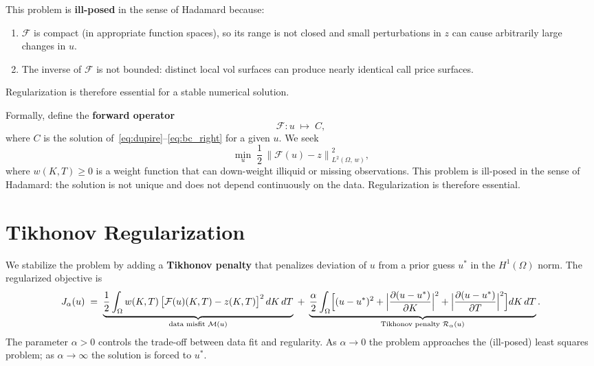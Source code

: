 \documentclass[11pt, a4paper]{article}
\newcommand{\pder}[2]{\frac{\partial #1}{\partial #2}}
\newcommand{\norm}[1]{\left\| #1 \right\|}
\newcommand{\Fop}{\mathcal{F}}          %
\newcommand{\Omg}{\Omega}
\theoremstyle{definition}
\theoremstyle{plain}
\begin{document}
This problem is \textbf{ill-posed} in the sense of Hadamard because:
\begin{enumerate}[label=(\roman*)]
  \item $\Fop$ is compact (in appropriate function spaces), so its range is
        not closed and small perturbations in $z$ can cause arbitrarily large
        changes in $u$.
  \item The inverse of $\Fop$ is not bounded: distinct local vol surfaces
        can produce nearly identical call price surfaces.
\end{enumerate}
Regularization is therefore essential for a stable numerical solution.

Formally, define the \textbf{forward operator}
\begin{equation}
  \Fop : u \;\longmapsto\; C,
\end{equation}
where $C$ is the solution of~\eqref{eq:dupire}--\eqref{eq:bc_right}
for a given $u$. We seek
\begin{equation}\label{eq:least_squares}
  \min_{u} \;\frac{1}{2}\,\norm{\Fop(u) - z}_{L^2(\Omg,\,w)}^2,
\end{equation}
where $w(K, T) \geq 0$ is a weight function that can down-weight illiquid
or missing observations. This problem is ill-posed in the sense of Hadamard:
the solution is not unique and does not depend continuously on the data.
Regularization is therefore essential.

\section{Tikhonov Regularization}

We stabilize the problem by adding a \textbf{Tikhonov penalty} that
penalizes deviation of $u$ from a prior guess $u^*$ in the $H^1(\Omg)$
norm. The regularized objective is
\begin{equation}\label{eq:Jalpha}
  J_\alpha(u)
  \;=\;
  \underbrace{
    \frac{1}{2}
    \int_\Omg w(K,T)\,\bigl[\Fop(u)(K,T) - z(K,T)\bigr]^2
    \,dK\,dT
  }_{\text{data misfit } \mathcal{M}(u)}
  \;+\;
  \underbrace{
    \frac{\alpha}{2}
    \int_\Omg
    \Bigl[
      (u - u^*)^2
      + \Bigl|\pder{(u-u^*)}{K}\Bigr|^2
      + \Bigl|\pder{(u-u^*)}{T}\Bigr|^2
    \Bigr]
    dK\,dT
  }_{\text{Tikhonov penalty } \mathcal{R}_\alpha(u)}.
\end{equation}
The parameter $\alpha > 0$ controls the trade-off between data fit and
regularity. As $\alpha \to 0$ the problem approaches the (ill-posed) least
squares problem; as $\alpha \to \infty$ the solution is forced to $u^*$.
\end{document}
